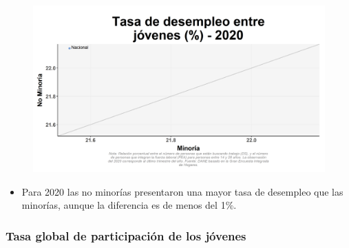     \begin{figure}[H]
        \caption[Tasa de desempleo joven por minorías y no minorías para 2020 ]{\label{desempjov_minoria_scatter} }
        \begin{center}
        \includegraphics[width=\textwidth,keepaspectratio]{img/var_54_scatter.png}
        \end{center}
    \end{figure}
            \begin{itemize}
                \item Para 2020 las no minorías presentaron una mayor tasa de desempleo que las minorías, aunque la diferencia es de menos del 1\%.
                \end{itemize}

        \subsubsection{Tasa global de participación de los jóvenes}

